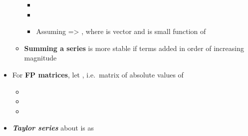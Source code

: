 \begin{itemize}
\begin{itemize}
                \begin{itemize}

                  \item
                  \item
                  \item
                        Assuming 
                        =\textgreater{}
                        ,
                        where  is vector
                        and  is small function of 
                \end{itemize}
          \item
                \textbf{Summing a series} is more stable if terms added in order of
                increasing magnitude
        \end{itemize}
  \item
        For \textbf{FP matrices}, let
        , i.e.~matrix
         of absolute values of 

        \begin{itemize}

          \item
          \item
          \item
        \end{itemize}
  \item
        \textbf{\emph{Taylor series}} about  is
        as 


\end{itemize}
